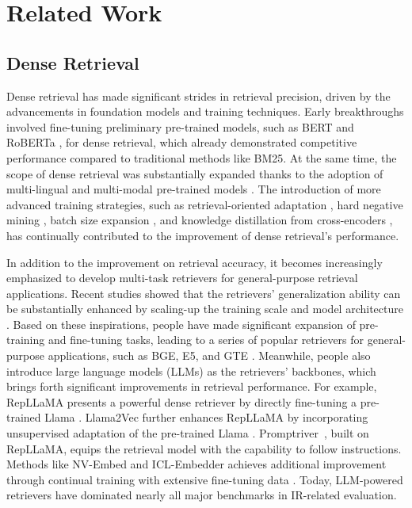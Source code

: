 \section{Related Work}

\subsection{Dense Retrieval}
Dense retrieval has made significant strides in retrieval precision, driven by the advancements in foundation models and training techniques. Early breakthroughs involved fine-tuning preliminary pre-trained models, such as BERT and RoBERTa \cite{devlin2018bert,liu2019roberta}, for dense retrieval, which already demonstrated competitive performance compared to traditional methods like BM25. At the same time, the scope of dense retrieval was substantially expanded thanks to the adoption of multi-lingual \cite{izacard2022unsuperviseddenseinformationretrieval,chen_bge_2024} and multi-modal pre-trained models \cite{wei2024uniir,zhou2024vista}. The introduction of more advanced training strategies, such as retrieval-oriented adaptation \cite{xiao_retromae_2022,liu_retromae-2_2023,wang_simlm_2023}, hard negative mining \cite{xiong_approximate_2020}, batch size expansion \cite{qu2020rocketqa}, and knowledge distillation from cross-encoders \cite{hofstatter_efficiently_2021}, has continually contributed to the improvement of dense retrieval's performance. 

In addition to the improvement on retrieval accuracy, it becomes increasingly emphasized to develop multi-task retrievers for general-purpose retrieval applications. Recent studies showed that the retrievers' generalization ability can be substantially enhanced by scaling-up the training scale \cite{su2022one} and model architecture \cite{ni_large_2022}. Based on these inspirations, people have made significant expansion of pre-training and fine-tuning tasks, leading to a series of popular retrievers for general-purpose applications, such as BGE, E5, and GTE \cite{wang2022text,li2023towards}. Meanwhile, people also introduce large language models (LLMs) as the retrievers' backbones, which brings forth significant improvements in retrieval performance. For example, RepLLaMA presents a powerful dense retriever by directly fine-tuning a pre-trained Llama \cite{wang2023improving}. Llama2Vec further enhances RepLLaMA by incorporating unsupervised adaptation of the pre-trained Llama \cite{li_llama2vec_2024}. Promptriver~\cite{weller_promptriever_2024}, built on RepLLaMA, equips the retrieval model with the capability to follow instructions. Methods like NV-Embed and ICL-Embedder achieves additional improvement through continual training with extensive fine-tuning data \cite{lee2024nv,li2024making}. Today, LLM-powered retrievers have dominated nearly all major benchmarks in IR-related evaluation. 

